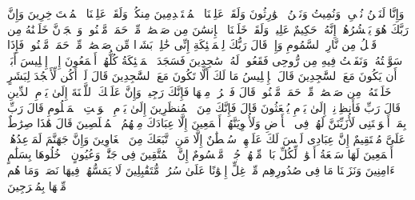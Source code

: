 \stopbuffer%
\startbuffer[\q:15:23]
وَإِنَّا لَنَحۡنُ نُحۡیِۦ وَنُمِیتُ وَنَحۡنُ ٱلۡوَٰرِثُونَ%
\stopbuffer%
\startbuffer[\q:15:24]
وَلَقَدۡ عَلِمۡنَا ٱلۡمُسۡتَقۡدِمِینَ مِنكُمۡ وَلَقَدۡ عَلِمۡنَا ٱلۡمُسۡتَءۡخِرِینَ%
\stopbuffer%
\startbuffer[\q:15:25]
وَإِنَّ رَبَّكَ هُوَ یَحۡشُرُهُمۡۚ إِنَّهُۥ حَكِیمٌ عَلِیمࣱ%
\stopbuffer%
\startbuffer[\q:15:26]
وَلَقَدۡ خَلَقۡنَا ٱلۡإِنسَٰنَ مِن صَلۡصَٰلࣲ مِّنۡ حَمَإࣲ مَّسۡنُونࣲ%
\stopbuffer%
\startbuffer[\q:15:27]
وَٱلۡجَاۤنَّ خَلَقۡنَٰهُ مِن قَبۡلُ مِن نَّارِ ٱلسَّمُومِ%
\stopbuffer%
\startbuffer[\q:15:28]
وَإِذۡ قَالَ رَبُّكَ لِلۡمَلَٰۤئِكَةِ إِنِّی خَٰلِقُۢ بَشَرࣰا مِّن صَلۡصَٰلࣲ مِّنۡ حَمَإࣲ مَّسۡنُونࣲ%
\stopbuffer%
\startbuffer[\q:15:29]
فَإِذَا سَوَّیۡتُهُۥ وَنَفَخۡتُ فِیهِ مِن رُّوحِی فَقَعُوا۟ لَهُۥ سَٰجِدِینَ%
\stopbuffer%
\startbuffer[\q:15:30]
فَسَجَدَ ٱلۡمَلَٰۤئِكَةُ كُلُّهُمۡ أَجۡمَعُونَ%
\stopbuffer%
\startbuffer[\q:15:31]
إِلَّاۤ إِبۡلِیسَ أَبَىٰۤ أَن یَكُونَ مَعَ ٱلسَّٰجِدِینَ%
\stopbuffer%
\startbuffer[\q:15:32]
قَالَ یَٰۤإِبۡلِیسُ مَا لَكَ أَلَّا تَكُونَ مَعَ ٱلسَّٰجِدِینَ%
\stopbuffer%
\startbuffer[\q:15:33]
قَالَ لَمۡ أَكُن لِّأَسۡجُدَ لِبَشَرٍ خَلَقۡتَهُۥ مِن صَلۡصَٰلࣲ مِّنۡ حَمَإࣲ مَّسۡنُونࣲ%
\stopbuffer%
\startbuffer[\q:15:34]
قَالَ فَٱخۡرُجۡ مِنۡهَا فَإِنَّكَ رَجِیمࣱ%
\stopbuffer%
\startbuffer[\q:15:35]
وَإِنَّ عَلَیۡكَ ٱللَّعۡنَةَ إِلَىٰ یَوۡمِ ٱلدِّینِ%
\stopbuffer%
\startbuffer[\q:15:36]
قَالَ رَبِّ فَأَنظِرۡنِیۤ إِلَىٰ یَوۡمِ یُبۡعَثُونَ%
\stopbuffer%
\startbuffer[\q:15:37]
قَالَ فَإِنَّكَ مِنَ ٱلۡمُنظَرِینَ%
\stopbuffer%
\startbuffer[\q:15:38]
إِلَىٰ یَوۡمِ ٱلۡوَقۡتِ ٱلۡمَعۡلُومِ%
\stopbuffer%
\startbuffer[\q:15:39]
قَالَ رَبِّ بِمَاۤ أَغۡوَیۡتَنِی لَأُزَیِّنَنَّ لَهُمۡ فِی ٱلۡأَرۡضِ وَلَأُغۡوِیَنَّهُمۡ أَجۡمَعِینَ%
\stopbuffer%
\startbuffer[\q:15:40]
إِلَّا عِبَادَكَ مِنۡهُمُ ٱلۡمُخۡلَصِینَ%
\stopbuffer%
\startbuffer[\q:15:41]
قَالَ هَٰذَا صِرَٰطٌ عَلَیَّ مُسۡتَقِیمٌ%
\stopbuffer%
\startbuffer[\q:15:42]
إِنَّ عِبَادِی لَیۡسَ لَكَ عَلَیۡهِمۡ سُلۡطَٰنٌ إِلَّا مَنِ ٱتَّبَعَكَ مِنَ ٱلۡغَاوِینَ%
\stopbuffer%
\startbuffer[\q:15:43]
وَإِنَّ جَهَنَّمَ لَمَوۡعِدُهُمۡ أَجۡمَعِینَ%
\stopbuffer%
\startbuffer[\q:15:44]
لَهَا سَبۡعَةُ أَبۡوَٰبࣲ لِّكُلِّ بَابࣲ مِّنۡهُمۡ جُزۡءࣱ مَّقۡسُومٌ%
\stopbuffer%
\startbuffer[\q:15:45]
إِنَّ ٱلۡمُتَّقِینَ فِی جَنَّٰتࣲ وَعُیُونٍ%
\stopbuffer%
\startbuffer[\q:15:46]
ٱدۡخُلُوهَا بِسَلَٰمٍ ءَامِنِینَ%
\stopbuffer%
\startbuffer[\q:15:47]
وَنَزَعۡنَا مَا فِی صُدُورِهِم مِّنۡ غِلٍّ إِخۡوَٰنًا عَلَىٰ سُرُرࣲ مُّتَقَٰبِلِینَ%
\stopbuffer%
\startbuffer[\q:15:48]
لَا یَمَسُّهُمۡ فِیهَا نَصَبࣱ وَمَا هُم مِّنۡهَا بِمُخۡرَجِینَ%
\stopbuffer%
